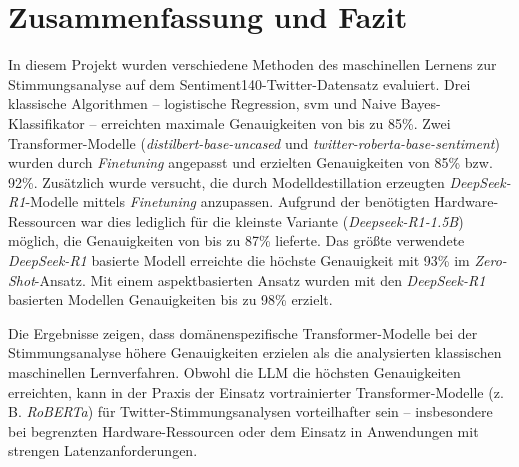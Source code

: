 \section{Zusammenfassung und Fazit}\label{sec:zusammenfassung-und-fazit}

In diesem Projekt wurden verschiedene Methoden des maschinellen Lernens zur Stimmungsanalyse auf dem Sentiment140-Twitter-Datensatz evaluiert.
Drei klassische Algorithmen – logistische Regression, \gls{svm} und Naive Bayes-Klassifikator – erreichten maximale Genauigkeiten von bis zu 85\%.
Zwei Transformer-Modelle (\emph{distilbert-base-uncased} und \emph{twitter-roberta-base-sentiment}) wurden durch \textit{Finetuning} angepasst und erzielten Genauigkeiten von 85\% bzw. 92\%.
Zusätzlich wurde versucht, die durch Modelldestillation erzeugten \emph{DeepSeek-R1}-Modelle mittels \textit{Finetuning} anzupassen.
Aufgrund der benötigten Hardware-Ressourcen war dies lediglich für die kleinste Variante (\emph{Deepseek-R1-1.5B}) möglich, die Genauigkeiten von bis zu 87\% lieferte.
Das größte verwendete \emph{DeepSeek-R1} basierte Modell erreichte die höchste Genauigkeit mit 93\% im \textit{Zero-Shot}-Ansatz.
Mit einem aspektbasierten Ansatz wurden mit den \emph{DeepSeek-R1} basierten Modellen Genauigkeiten bis zu 98\% erzielt.

Die Ergebnisse zeigen, dass domänenspezifische Transformer-Modelle bei der Stimmungsanalyse höhere Genauigkeiten erzielen als die analysierten klassischen maschinellen Lernverfahren.
Obwohl die LLM die höchsten Genauigkeiten erreichten, kann in der Praxis der Einsatz vortrainierter Transformer-Modelle (z. B. \emph{RoBERTa}) für Twitter-Stimmungsanalysen vorteilhafter sein – insbesondere bei begrenzten Hardware-Ressourcen oder dem Einsatz in Anwendungen mit strengen Latenzanforderungen.
